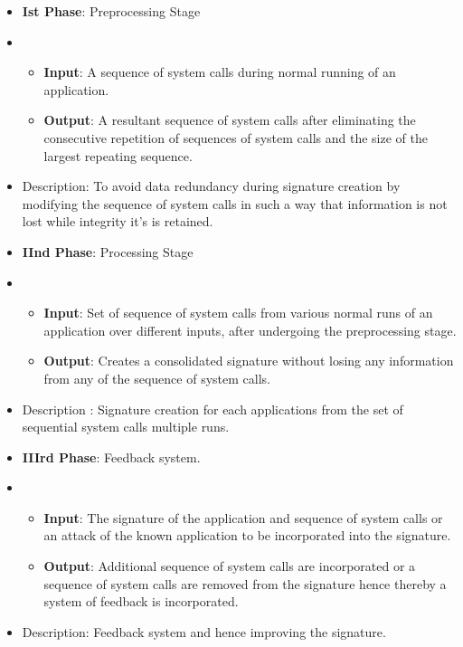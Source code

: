 \begin{itemize}
    \item[] \textbf{Ist Phase}: Preprocessing Stage
    \item[] \begin{itemize}
                \item[] \textbf{Input}: A sequence of system calls during normal running of an application. 
                \item[] \textbf{Output}: A resultant sequence of system calls after eliminating the consecutive repetition of sequences of system calls and the size of the largest repeating sequence.
            \end{itemize}
    \item[] Description: To avoid data redundancy during signature creation by modifying the sequence of system calls in such a way that information is not lost while integrity it’s is retained.

    \item[] \textbf{IInd Phase}: Processing Stage
    \item[] \begin{itemize}
                \item[] \textbf{Input}: Set of sequence of system calls from various normal runs of an application over different inputs, after undergoing the preprocessing stage.
                \item[] \textbf{Output}: Creates a consolidated signature without losing any information from any of the sequence of system calls.
            \end{itemize}
    \item[] Description : Signature creation for each applications from the set of sequential system calls  multiple runs.

    \item[] \textbf{IIIrd Phase}: Feedback system.
    \item[] \begin{itemize}
                \item[] \textbf{Input}: The signature of the application and sequence of system calls or an attack of the known application to be incorporated into the signature.
                \item[] \textbf{Output}: Additional sequence of system calls are incorporated or a sequence of system calls are removed from the signature hence thereby a system of feedback is incorporated.
            \end{itemize}
    \item[] Description: Feedback system and hence improving the signature.


\end{itemize}
